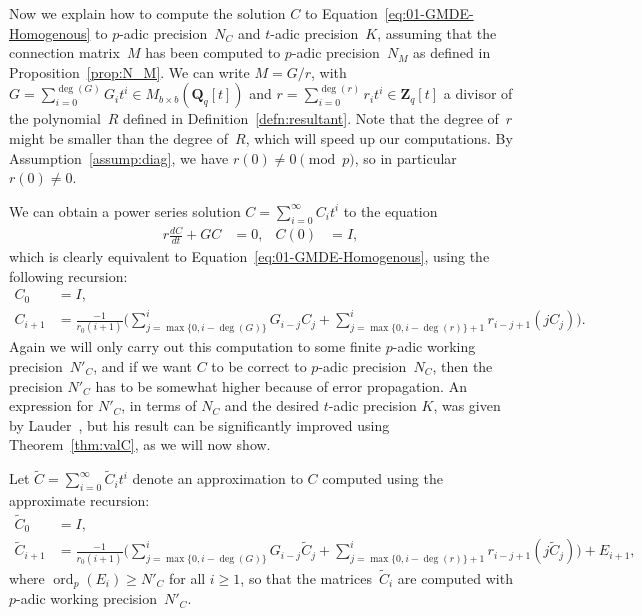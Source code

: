 \documentclass[a4paper,11pt]{article}
\numberwithin{equation}{section}
\newcommand{\ZZ}{\mathbf{Z}} %
\newcommand{\QQ}{\mathbf{Q}} %
\DeclareMathOperator{\ord}{ord}          %
\theoremstyle{definition}
\begin{document}
Now we explain how to compute the solution $C$ to 
Equation~\eqref{eq:01-GMDE-Homogenous} to $p$-adic precision~$N_C$ and 
$t$-adic precision~$K$, assuming that the connection matrix~$M$ has been 
computed to $p$-adic precision~$N_M$ as defined in Proposition~\ref{prop:N_M}. 
We can write $M = G/r$, with 
$G = \sum_{i=0}^{\deg(G)} G_i t^i \in M_{b \times b}(\QQ_q[t])$ 
and $r = \sum_{i=0}^{\deg(r)} r_i t^i \in \ZZ_q[t]$ a divisor of the 
polynomial~$R$ defined in Definition~\ref{defn:resultant}. 
Note that the degree of~$r$ might be smaller than the degree 
of~$R$, which will speed up our computations. By Assumption~\ref{assump:diag}, 
we have $r(0) \neq 0 \pmod{p}$, so in particular $r(0) \neq 0$.  

We can obtain a power series solution $C = \sum_{i=0}^{\infty} C_i t^i$ to
the equation
\begin{align*}
r \frac{dC}{dt} + G C &= 0, &C(0)& = I,
\end{align*}
which is clearly equivalent to 
Equation~\eqref{eq:01-GMDE-Homogenous}, using the following recursion:  
\begin{align} \label{eq:recursiondifeq}
C_0 &= I, \nonumber \\
C_{i+1} &= \frac{-1}{r_0 (i+1)} \biggl(
    \sum_{j=\max{\{0,i-\deg(G)\}}}^i G_{i-j} C_j + 
    \sum_{j=\max{\{0,i-\deg(r)\}}+1}^i r_{i-j+1} (j C_j) \biggr).
\end{align}
Again we will only carry out this computation to some finite $p$-adic 
working precision~$N'_C$, and if we want $C$ to be correct to $p$-adic 
precision~$N_C$, then the precision $N'_C$ has to be somewhat higher 
because of error propagation. An expression for $N'_C$, in terms of 
$N_C$ and the desired $t$-adic precision $K$, was given by 
Lauder~\citep[Theorem~5.1]{Lauder2006}, but his result can be
significantly improved using Theorem~\ref{thm:valC}, as we will now show. 

Let $\tilde{C}=\sum_{i=0}^{\infty} \tilde{C}_i t^i$ denote an 
approximation to $C$ computed using the approximate recursion:  
\begin{align*}
\tilde{C}_0 &= I, \\
\tilde{C}_{i+1} &= \frac{-1}{r_0 (i+1)} \biggl(
    \sum_{j=\max{\{0,i-\deg({G})\}}}^i {G}_{i-j} \tilde{C}_j + 
    \sum_{j=\max{\{0,i-\deg({r})\}}+1}^i {r}_{i-j+1} (j \tilde{C}_j) \biggr) + {E}_{i+1},
\end{align*}
where $\ord_p({E}_i) \geq N'_{C}$ for all $i \geq 1$, 
so that the matrices~$\tilde{C}_i$ are computed with $p$-adic working 
precision~$N'_C$.
\end{document}
